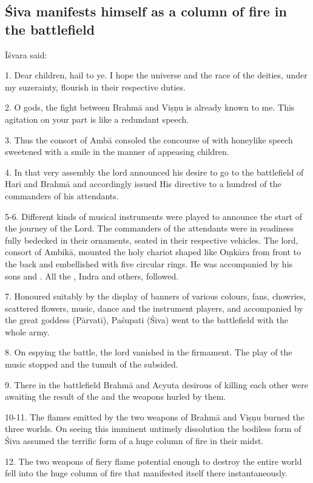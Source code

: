 \subsection{Śiva manifests himself as a column of fire in the battlefield}

Īśvara said:

1. Dear children, hail to ye. I hope the universe and the race of the deities,
under my suzerainty, flourish in their respective duties.

2. O gods, the fight between Brahmā and Viṣṇu is already known to me. This
agitation on your part is like a redundant speech.

3. Thus the consort of Ambā consoled the concourse of  with honeylike
speech sweetened with a smile in the manner of appeasing children.

4. In that very assembly the lord announced his desire to go to the battlefield
of Hari and Brahmā and accordingly issued His directive to a hundred of
the commanders of his attendants.

5-6. Different kinds of musical instruments were played to announce the start of
the journey of the Lord. The commanders of the attendants were in readiness
fully bedecked in their ornaments, seated in their respective vehicles. The lord,
consort of Ambikā, mounted the holy chariot shaped like Oṃkāra from front to
the back and embellished with five circular rings. He was accompanied by his
sons and . All the , Indra and others, followed.

7. Honoured suitably by the display of banners of various colours, fans,
chowries, scattered flowers, music, dance and the instrument players, and
accompanied by the great goddess (Pārvatī), Paśupati (Śiva) went to
the battlefield with the whole army.

8. On espying the battle, the lord vanished in the firmament. The play of
the music stopped and the tumult of the  subsided.

9. There in the battlefield Brahmā and Acyuta desirous of killing each other
were awaiting the result of the  and the  weapons
hurled by them.

10-11. The flames emitted by the two weapons of Brahmā and Viṣṇu burned
the three worlds. On seeing this imminent untimely dissolution the bodiless form
of Śiva assumed the terrific form of a huge column of fire in their midst.

12. The two weapons of fiery flame potential enough to destroy the entire world
fell into the huge column of fire that manifested itself there instantaneously.

